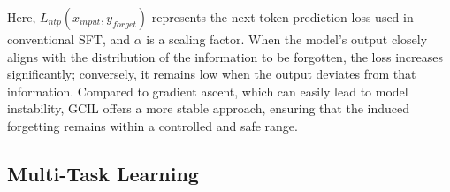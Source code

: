 \documentclass[11pt]{article}
\begin{document}


Here, $L_{ntp}(x_{input},y_{forget})$ represents the next-token prediction loss used in conventional SFT, and $\alpha$ is a scaling factor. When the model's output closely aligns with the distribution of the information to be forgotten, the loss increases significantly; conversely, it remains low when the output deviates from that information. Compared to gradient ascent, which can easily lead to model instability, GCIL offers a more stable approach, ensuring that the induced forgetting remains within a controlled and safe range.

\subsection{Multi-Task Learning}
\label{sec:MTL}
\end{document}
